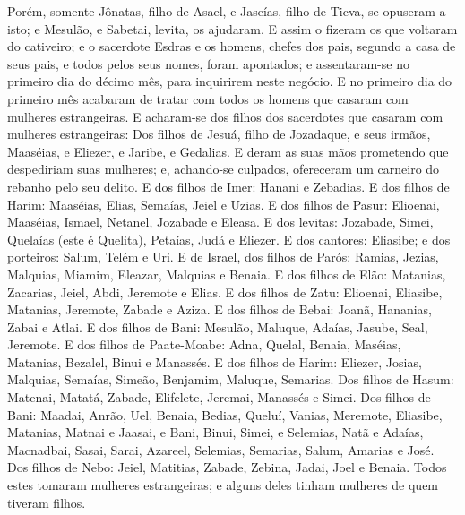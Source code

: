 Porém, somente Jônatas, filho de Asael, e Jaseías, filho de
Ticva, se opuseram a isto; e Mesulão, e Sabetai, levita, os
ajudaram. E assim o fizeram os que voltaram do cativeiro; e o
sacerdote Esdras e os homens, chefes dos pais, segundo a casa de
seus pais, e todos pelos seus nomes, foram apontados; e
assentaram-se no primeiro dia do décimo mês, para inquirirem neste
negócio. E no primeiro dia do primeiro mês acabaram de tratar
com todos os homens que casaram com mulheres estrangeiras. E
acharam-se dos filhos dos sacerdotes que casaram com mulheres
estrangeiras: Dos filhos de Jesuá, filho de Jozadaque, e seus
irmãos, Maaséias, e Eliezer, e Jaribe, e Gedalias. E deram as
suas mãos prometendo que despediriam suas mulheres; e, achando-se
culpados, ofereceram um carneiro do rebanho pelo seu delito.
E dos filhos de Imer: Hanani e Zebadias. E dos filhos
de Harim: Maaséias, Elias, Semaías, Jeiel e Uzias. E dos
filhos de Pasur: Elioenai, Maaséias, Ismael, Netanel, Jozabade e
Eleasa. E dos levitas: Jozabade, Simei, Quelaías (este é
Quelita), Petaías, Judá e Eliezer. E dos cantores: Eliasibe;
e dos porteiros: Salum, Telém e Uri. E de Israel, dos filhos
de Parós: Ramias, Jezias, Malquias, Miamim, Eleazar, Malquias e
Benaia. E dos filhos de Elão: Matanias, Zacarias, Jeiel,
Abdi, Jeremote e Elias. E dos filhos de Zatu: Elioenai,
Eliasibe, Matanias, Jeremote, Zabade e Aziza. E dos filhos de
Bebai: Joanã, Hananias, Zabai e Atlai. E dos filhos de Bani:
Mesulão, Maluque, Adaías, Jasube, Seal, Jeremote. E dos
filhos de Paate-Moabe: Adna, Quelal, Benaia, Maséias, Matanias,
Bezalel, Binui e Manassés. E dos filhos de Harim: Eliezer,
Josias, Malquias, Semaías, Simeão, Benjamim, Maluque,
Semarias. Dos filhos de Hasum: Matenai, Matatá, Zabade,
Elifelete, Jeremai, Manassés e Simei. Dos filhos de Bani:
Maadai, Anrão, Uel, Benaia, Bedias, Queluí, Vanias,
Meremote, Eliasibe, Matanias, Matnai e Jaasai, e Bani,
Binui, Simei, e Selemias, Natã e Adaías, Macnadbai,
Sasai, Sarai, Azareel, Selemias, Semarias, Salum,
Amarias e José. Dos filhos de Nebo: Jeiel, Matitias, Zabade,
Zebina, Jadai, Joel e Benaia. Todos estes tomaram mulheres
estrangeiras; e alguns deles tinham mulheres de quem tiveram filhos.

